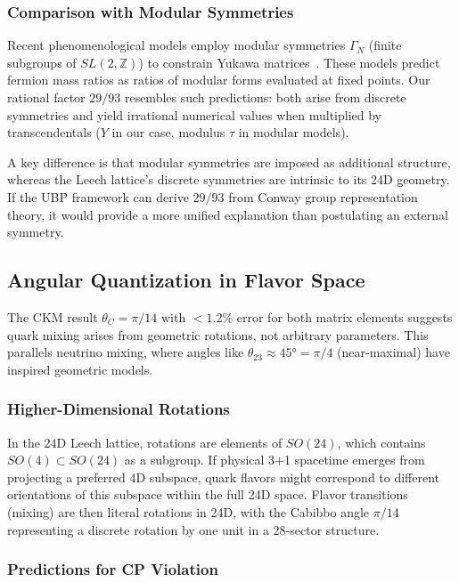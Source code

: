 \documentclass[11pt,a4paper]{article}
\begin{document}
\subsubsection{Comparison with Modular Symmetries}

Recent phenomenological models employ modular symmetries $\Gamma_N$ (finite subgroups of $SL(2,\mathbb{Z})$) to constrain Yukawa matrices~\cite{ref001,ref006}. These models predict fermion mass ratios as ratios of modular forms evaluated at fixed points. Our rational factor $29/93$ resembles such predictions: both arise from discrete symmetries and yield irrational numerical values when multiplied by transcendentals ($Y$ in our case, modulus $\tau$ in modular models).

A key difference is that modular symmetries are imposed as additional structure, whereas the Leech lattice's discrete symmetries are intrinsic to its 24D geometry. If the UBP framework can derive $29/93$ from Conway group representation theory, it would provide a more unified explanation than postulating an external symmetry.

\subsection{Angular Quantization in Flavor Space}

The CKM result $\theta_C = \pi/14$ with $<1.2\%$ error for both matrix elements suggests quark mixing arises from geometric rotations, not arbitrary parameters. This parallels neutrino mixing, where angles like $\theta_{23} \approx 45° = \pi/4$ (near-maximal) have inspired geometric models.

\subsubsection{Higher-Dimensional Rotations}

In the 24D Leech lattice, rotations are elements of $SO(24)$, which contains $SO(4) \subset SO(24)$ as a subgroup. If physical 3+1 spacetime emerges from projecting a preferred 4D subspace, quark flavors might correspond to different orientations of this subspace within the full 24D space. Flavor transitions (mixing) are then literal rotations in 24D, with the Cabibbo angle $\pi/14$ representing a discrete rotation by one unit in a 28-sector structure.

\subsubsection{Predictions for CP Violation}
\end{document}
